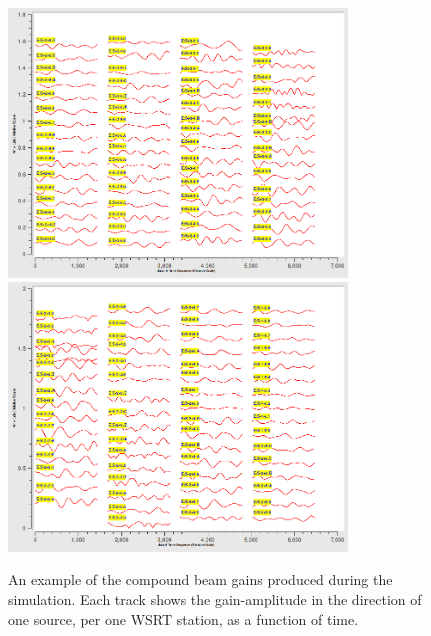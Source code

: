 \documentclass{aps2010} \special{papersize=8.5in,11in}
\begin{document}
\begin{figure}
\includegraphics[width=9cm]{inspector_gains1}%
\includegraphics[width=9cm]{inspector_gains2} 
\caption{\label{fig:gains}An example of the compound beam gains produced during the simulation. Each track shows the gain-amplitude in the direction of one source, per one WSRT station, as a function of time.}
\end{figure}
\end{document}
